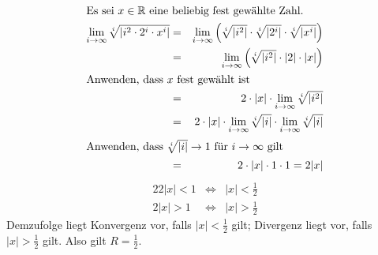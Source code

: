 \documentclass[10pt,a4paper,oneside,ngerman,numbers=noenddot]{scrartcl}
\begin{document}
\subsubsection{} %
\begin{alignat*}{2}
\intertext{Es sei $x \in \mathbb{R}$ eine beliebig fest gewählte Zahl.}
\lim\limits_{i \rightarrow \infty} \sqrt[i]{\left| i^{2} \cdot 2^{i} \cdot x^{i} \right|} &=& \lim\limits_{i \rightarrow \infty} \left( \sqrt[i]{\left| i^{2} \right|} \cdot \sqrt[i]{\left| 2^{i} \right|} \cdot \sqrt[i]{\left| x^{i} \right|} \right) \\
&=& \lim\limits_{i \rightarrow \infty} \left( \sqrt[i]{\left| i^{2} \right|} \cdot |2| \cdot |x| \right) \\
\intertext{Anwenden, dass $x$ fest gewählt ist}
&=& 2 \cdot |x| \cdot \lim\limits_{i \rightarrow \infty} \sqrt[i]{\left| i^{2} \right|} \\
&=& 2 \cdot |x| \cdot \lim\limits_{i \rightarrow \infty} \sqrt[i]{|i|} \cdot \lim\limits_{i \rightarrow \infty} \sqrt[i]{|i|} \\
\intertext{Anwenden, dass $\sqrt[i]{|i|} \rightarrow 1$ für $i \rightarrow \infty$ gilt}
&=& 2 \cdot |x| \cdot 1 \cdot 1 = 2|x|
\end{alignat*}
\begin{alignat*}{2}
2|x| < 1 &\Longleftrightarrow & |x| < \frac{1}{2} \\
2|x| > 1 &\Longleftrightarrow & |x| > \frac{1}{2}
\end{alignat*}
Demzufolge liegt Konvergenz vor, falls $|x| < \frac{1}{2}$ gilt; Divergenz liegt vor, falls $|x| > \frac{1}{2}$ gilt. Also gilt $R = \frac{1}{2}$.
\section{} %
\setcounter{subsubsection}{0}
\end{document}
